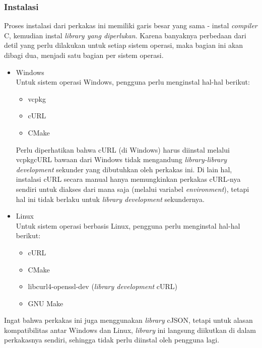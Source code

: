 \subsubsection{Instalasi}
\label{sec:testing-implementation-usage-instalation}

Proses instalasi dari perkakas ini memiliki garis besar yang sama - instal \textit{compiler} C, kemudian instal \textit{library yang diperlukan}. Karena banyaknya perbedaan dari detil yang perlu dilakukan untuk setiap sistem operasi, maka bagian ini akan dibagi dua, menjadi satu bagian per sistem operasi.

\begin{itemize}
	\item Windows \\
	Untuk sistem operasi Windows, pengguna perlu menginstal hal-hal berikut:
	
	\begin{itemize}
		\item vcpkg
		\item cURL
		\item CMake
	\end{itemize}
	
	Perlu diperhatikan bahwa cURL (di Windows) harus diinstal melalui vcpkg\textemdash cURL bawaan dari Windows tidak mengandung \textit{library-library development} sekunder yang dibutuhkan oleh perkakas ini. Di lain hal, instalasi cURL secara manual hanya memungkinkan perkakas cURL-nya sendiri untuk diakses dari mana saja (melalui variabel \textit{environment}), tetapi hal ini tidak berlaku untuk \textit{library development} sekundernya.
	
	\item Linux \\
	Untuk sistem operasi berbasis Linux, pengguna perlu menginstal hal-hal berikut:
	
	\begin{itemize}
		\item cURL
		\item CMake
		\item libcurl4-openssl-dev (\textit{library development} cURL)
		\item GNU Make
	\end{itemize}
	
\end{itemize}

Ingat bahwa perkakas ini juga menggunakan \textit{library} cJSON, tetapi untuk alasan kompatibilitas antar Windows dan Linux, \textit{library} ini langsung diikutkan di dalam perkakasnya sendiri, sehingga tidak perlu diinstal oleh pengguna lagi.

